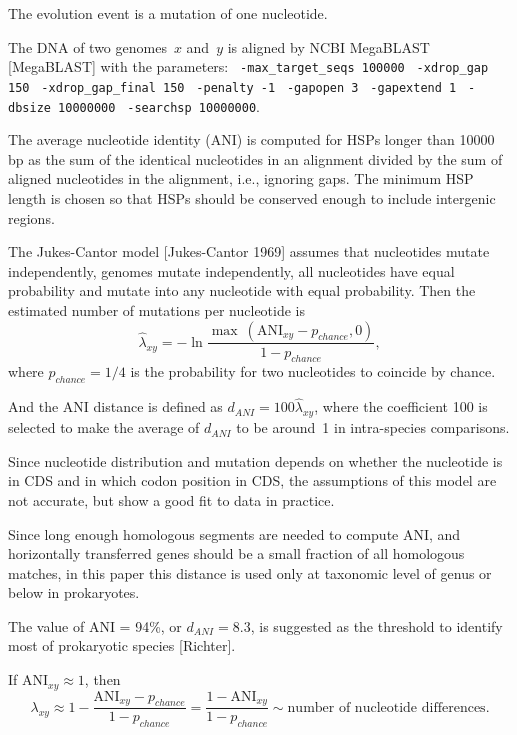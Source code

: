 \documentclass[10pt,a4paper]{article}
\begin{document}

The evolution event is a mutation of one nucleotide. 

The DNA of two genomes~$x$ and~$y$ is aligned by NCBI MegaBLAST [MegaBLAST] with the parameters: 
\verb| -max_target_seqs 100000| 
\verb| -xdrop_gap 150| 
\verb| -xdrop_gap_final 150| 
\verb| -penalty -1| 
\verb| -gapopen 3| 
\verb| -gapextend 1| 
\verb| -dbsize 10000000| 
\verb| -searchsp 10000000|. 

The average nucleotide identity (ANI) is computed for HSPs longer than 10000 bp as the sum of the identical nucleotides in an alignment divided by the sum of aligned nucleotides in the alignment, 
i.e., ignoring gaps. 
The minimum HSP length is chosen so that HSPs should be conserved enough to include intergenic regions.

The Jukes-Cantor model [Jukes-Cantor 1969] assumes that nucleotides mutate independently, genomes mutate independently, all nucleotides have equal probability and mutate into any nucleotide with equal probability. 
Then the estimated number of mutations per nucleotide is
$$ \hat \lambda_{xy} = - \ln \frac {\max \ (\mathrm{ANI}_{xy} - p_{chance}, 0)} {1 - p_{chance}}, $$
where $p_{chance} = 1/4$ is the probability for two nucleotides to coincide by chance.

And the ANI distance is defined as
$ d_{ANI} = 100 \hat \lambda_{xy}$,
where the coefficient 100 is selected to make the average of $d_{ANI}$ to be around~1 in intra-species comparisons.

Since nucleotide distribution and mutation depends on whether the nucleotide is in CDS and in which codon position in CDS, 
the assumptions of this model are not accurate, but show a good fit to data in practice.

Since long enough homologous segments are needed to compute ANI, 
and horizontally transferred genes should be a small fraction of all homologous matches, 
in this paper this distance is used only at taxonomic level of genus or below in prokaryotes.

The value of ANI = 94\%, or $d_{ANI} = 8.3$, is suggested as the threshold to identify most of prokaryotic species [Richter].

If $\mathrm{ANI}_{xy} \approx 1$, then 
$$ \lambda_{xy} \approx 1 - \frac {\mathrm{ANI}_{xy} - p_{chance}} {1 - p_{chance}} = \frac {1 - \mathrm{ANI}_{xy}}  {1 - p_{chance}} 
  \sim \textrm{number of nucleotide differences}.
$$
\end{document}
